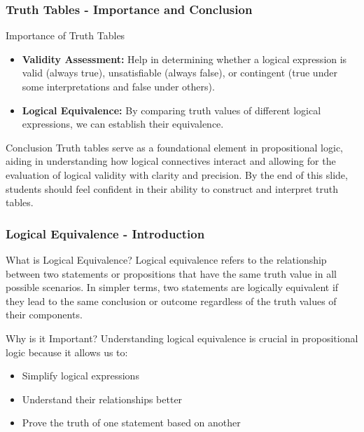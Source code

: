 \documentclass[aspectratio=169]{beamer}
\begin{document}
\begin{frame}[fragile]
    \frametitle{Truth Tables - Importance and Conclusion}
    \begin{block}{Importance of Truth Tables}
        \begin{itemize}
            \item \textbf{Validity Assessment:} Help in determining whether a logical expression is valid (always true),
            unsatisfiable (always false), or contingent (true under some interpretations and false under others).
            \item \textbf{Logical Equivalence:} By comparing truth values of different logical expressions, we can establish their equivalence.
        \end{itemize}
    \end{block}

    \begin{block}{Conclusion}
        Truth tables serve as a foundational element in propositional logic, 
        aiding in understanding how logical connectives interact and allowing 
        for the evaluation of logical validity with clarity and precision. 
        By the end of this slide, students should feel confident in their ability to 
        construct and interpret truth tables.
    \end{block}
\end{frame}

\begin{frame}[fragile]
    \frametitle{Logical Equivalence - Introduction}
    \begin{block}{What is Logical Equivalence?}
        Logical equivalence refers to the relationship between two statements or propositions that have the same truth value in all possible scenarios. 
        In simpler terms, two statements are logically equivalent if they lead to the same conclusion or outcome regardless of the truth values of their components.
    \end{block}
    
    \begin{block}{Why is it Important?}
        Understanding logical equivalence is crucial in propositional logic because it allows us to:
        \begin{itemize}
            \item Simplify logical expressions
            \item Understand their relationships better
            \item Prove the truth of one statement based on another
        \end{itemize}
    \end{block}
\end{frame}
\end{document}
